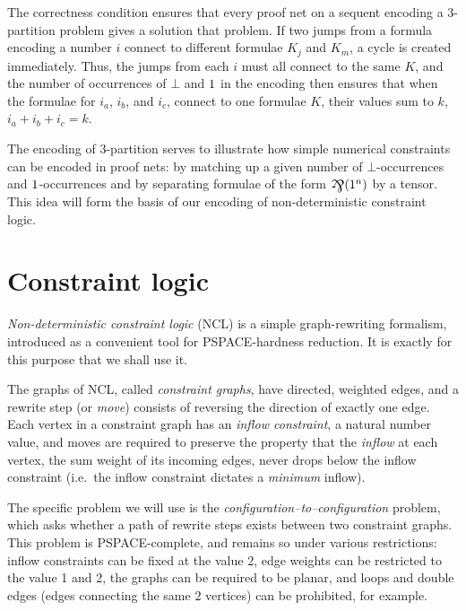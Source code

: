 \documentclass{lmcs}
\let\capsabbrev=\uppercase
\begin{document}
The correctness condition ensures that every proof net on a sequent encoding a 3-partition problem gives a solution that problem. If two jumps from a formula encoding a number $i$ connect to different formulae $K_j$ and $K_m$, a cycle is created immediately. Thus, the jumps from each $i$ must all connect to the same $K$, and the number of occurrences of $\bot$ and $1$ in the encoding then ensures that when the formulae for $i_a$, $i_b$, and $i_c$, connect to one formulae $K$, their values sum to $k$, $i_a+i_b+i_c=k$.

The encoding of 3-partition serves to illustrate how simple numerical constraints can be encoded in proof nets: by matching up a given number of $\bot$-occurrences and $1$-occurrences and by separating formulae of the form $\bigparr(\1^n)$ by a tensor. This idea will form the basis of our encoding of non-deterministic constraint logic.




\section{Constraint logic}
\label{sec:ncl}


\emph{Non-deterministic constraint logic} (NCL) \cite{Hearn-Demaine-2005,Demaine-Hearn-2008,GamesPuzzlesAndComputation} is a simple graph-rewriting formalism, introduced as a convenient tool for \capsabbrev{pspace}-hardness reduction. It is exactly for this purpose that we shall use it.

The graphs of NCL, called \emph{constraint graphs}, have directed, weighted edges, and a rewrite step (or \emph{move}) consists of reversing the direction of exactly one edge. Each vertex in a constraint graph has an \emph{inflow constraint}, a natural number value, and moves are required to preserve the property that the \emph{inflow} at each vertex, the sum weight of its incoming edges, never drops below the inflow constraint (i.e.\ the inflow constraint dictates a \emph{minimum} inflow).

The specific problem we will use is the \emph{configuration--to--configuration} problem, which asks whether a path of rewrite steps exists between two constraint graphs. This problem is PSPACE-complete, and remains so under various restrictions: inflow constraints can be fixed at the value 2, edge weights can be restricted to the value 1 and 2, the graphs can be required to be planar, and loops and double edges (edges connecting the same 2 vertices) can be prohibited, for example. 
\end{document}
